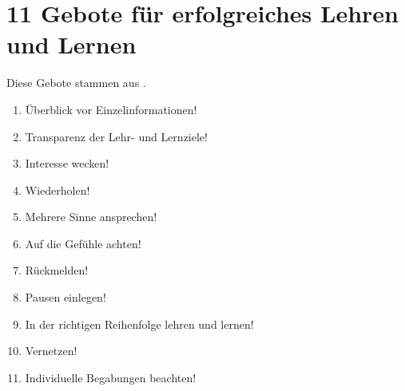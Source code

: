 \section{11 Gebote für erfolgreiches Lehren und Lernen}
\label{lerngebote}

Diese Gebote stammen aus \cite{kopf}.

\begin{enumerate}
  \item Überblick vor Einzelinformationen!
  \item Transparenz der Lehr- und Lernziele!
  \item Interesse wecken!
  \item Wiederholen!
  \item Mehrere Sinne ansprechen!
  \item Auf die Gefühle achten!
  \item Rückmelden!
  \item Pausen einlegen!
  \item In der richtigen Reihenfolge lehren und lernen!
  \item Vernetzen!
  \item Individuelle Begabungen beachten!
\end{enumerate}

